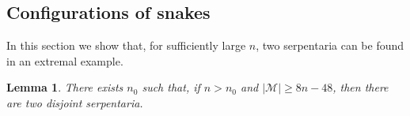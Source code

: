 \documentclass[12pt,a4paper]{article}
\newcommand{\M}{\mathcal{M}}
\newtheorem{lemma}[theorem]{Lemma}
\begin{document}
\subsection{Configurations of snakes}


In this section we show that, for sufficiently large $n$, two serpentaria can be found in an extremal example.

\begin{lemma}\label{thm3}
    There exists $n_0$ such that, if $n>n_0$ and $|\M| \geqslant 8n-48$, then there are two disjoint serpentaria.
\end{lemma}
\end{document}

